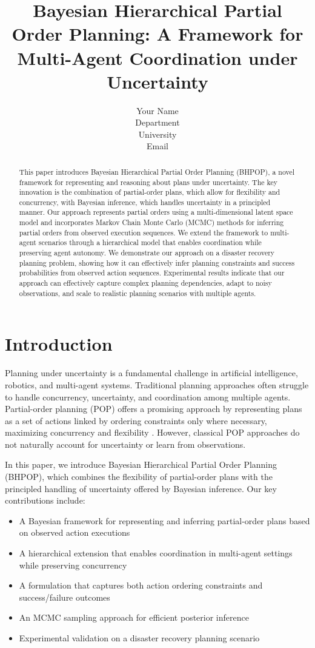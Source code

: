 \documentclass[twocolumn, 10pt]{article}
\title{Bayesian Hierarchical Partial Order Planning: A Framework for Multi-Agent Coordination under Uncertainty}
\author{Your Name\\
Department\\
University\\
Email
}
\begin{document}
\maketitle

\begin{abstract}
This paper introduces Bayesian Hierarchical Partial Order Planning (BHPOP), a novel framework for representing and reasoning about plans under uncertainty. The key innovation is the combination of partial-order plans, which allow for flexibility and concurrency, with Bayesian inference, which handles uncertainty in a principled manner. Our approach represents partial orders using a multi-dimensional latent space model and incorporates Markov Chain Monte Carlo (MCMC) methods for inferring partial orders from observed execution sequences. We extend the framework to multi-agent scenarios through a hierarchical model that enables coordination while preserving agent autonomy. We demonstrate our approach on a disaster recovery planning problem, showing how it can effectively infer planning constraints and success probabilities from observed action sequences. Experimental results indicate that our approach can effectively capture complex planning dependencies, adapt to noisy observations, and scale to realistic planning scenarios with multiple agents.
\end{abstract}

\section{Introduction}
Planning under uncertainty is a fundamental challenge in artificial intelligence, robotics, and multi-agent systems. Traditional planning approaches often struggle to handle concurrency, uncertainty, and coordination among multiple agents. Partial-order planning (POP) offers a promising approach by representing plans as a set of actions linked by ordering constraints only where necessary, maximizing concurrency and flexibility \citep{weld1994introduction}. However, classical POP approaches do not naturally account for uncertainty or learn from observations.

In this paper, we introduce Bayesian Hierarchical Partial Order Planning (BHPOP), which combines the flexibility of partial-order plans with the principled handling of uncertainty offered by Bayesian inference. Our key contributions include:

\begin{itemize}
    \item A Bayesian framework for representing and inferring partial-order plans based on observed action executions
    \item A hierarchical extension that enables coordination in multi-agent settings while preserving concurrency
    \item A formulation that captures both action ordering constraints and success/failure outcomes
    \item An MCMC sampling approach for efficient posterior inference
    \item Experimental validation on a disaster recovery planning scenario
\end{itemize}
\end{document}
